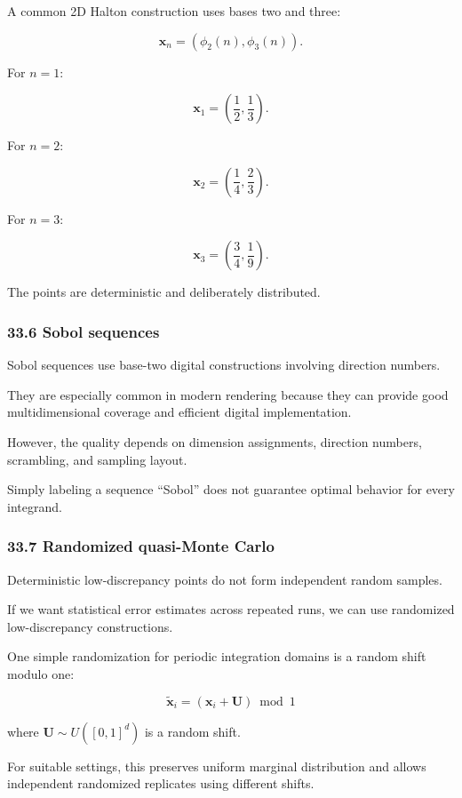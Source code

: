A common 2D Halton construction uses bases two and three:

\[ \boxed{ \mathbf x_n= (\phi_2(n),\phi_3(n)) }. \]

For \(n=1\):

\[ \boxed{ \mathbf x_1= \left(\frac12,\frac13\right) }. \]

For \(n=2\):

\[ \boxed{ \mathbf x_2= \left(\frac14,\frac23\right) }. \]

For \(n=3\):

\[ \boxed{ \mathbf x_3= \left(\frac34,\frac19\right) }. \]

The points are deterministic and deliberately distributed.

\subsubsection{33.6 Sobol sequences}\label{sobol-sequences}

Sobol sequences use base-two digital constructions involving direction numbers.

They are especially common in modern rendering because they can provide good multidimensional coverage and efficient digital implementation.

However, the quality depends on dimension assignments, direction numbers, scrambling, and sampling layout.

Simply labeling a sequence ``Sobol'' does not guarantee optimal behavior for every integrand.

\subsubsection{33.7 Randomized quasi-Monte Carlo}\label{randomized-quasi-monte-carlo}

Deterministic low-discrepancy points do not form independent random samples.

If we want statistical error estimates across repeated runs, we can use randomized low-discrepancy constructions.

One simple randomization for periodic integration domains is a random shift modulo one:

\[ \boxed{ \tilde{\mathbf x}_i = (\mathbf x_i+\mathbf U)\bmod1 } \]

where \(\mathbf U\sim U([0,1]^d)\) is a random shift.

For suitable settings, this preserves uniform marginal distribution and allows independent randomized replicates using different shifts.

